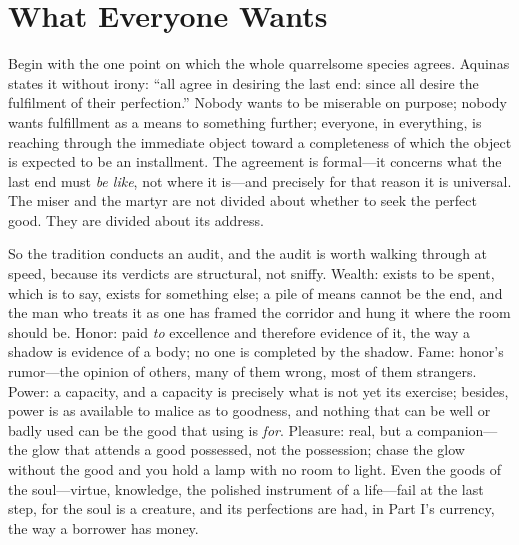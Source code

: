 \section{What Everyone Wants}

Begin with the one point on which the whole quarrelsome species agrees. Aquinas states it without irony: ``all agree in desiring the last end: since all desire the fulfilment of their perfection.'' Nobody wants to be miserable on purpose; nobody wants fulfillment as a means to something further; everyone, in everything, is reaching through the immediate object toward a completeness of which the object is expected to be an installment. The agreement is formal---it concerns what the last end must \emph{be like}, not where it is---and precisely for that reason it is universal. The miser and the martyr are not divided about whether to seek the perfect good. They are divided about its address.

So the tradition conducts an audit, and the audit is worth walking through at speed, because its verdicts are structural, not sniffy. Wealth: exists to be spent, which is to say, exists for something else; a pile of means cannot be the end, and the man who treats it as one has framed the corridor and hung it where the room should be. Honor: paid \emph{to} excellence and therefore evidence of it, the way a shadow is evidence of a body; no one is completed by the shadow. Fame: honor's rumor---the opinion of others, many of them wrong, most of them strangers. Power: a capacity, and a capacity is precisely what is not yet its exercise; besides, power is as available to malice as to goodness, and nothing that can be well or badly used can be the good that using is \emph{for}. Pleasure: real, but a companion---the glow that attends a good possessed, not the possession; chase the glow without the good and you hold a lamp with no room to light. Even the goods of the soul---virtue, knowledge, the polished instrument of a life---fail at the last step, for the soul is a creature, and its perfections are had, in Part I's currency, the way a borrower has money.


